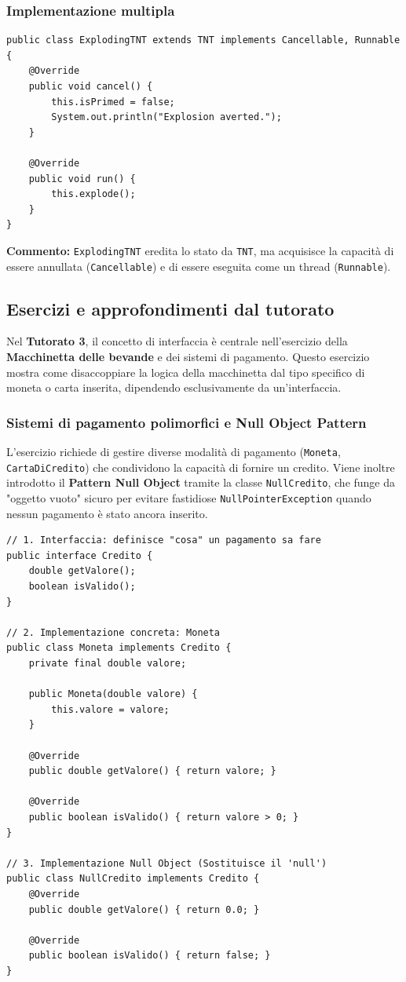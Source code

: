 \documentclass[12pt, a4paper]{article}
\begin{document}
\subsubsection{Implementazione multipla}
\begin{verbatim}
public class ExplodingTNT extends TNT implements Cancellable, Runnable {
    @Override
    public void cancel() {
        this.isPrimed = false;
        System.out.println("Explosion averted.");
    }

    @Override
    public void run() {
        this.explode();
    }
}
\end{verbatim}
\textbf{Commento:} \texttt{ExplodingTNT} eredita lo stato da \texttt{TNT}, ma acquisisce la capacità di essere annullata (\texttt{Cancellable}) e di essere eseguita come un thread (\texttt{Runnable}).

\subsection{Esercizi e approfondimenti dal tutorato}
Nel \textbf{Tutorato 3}, il concetto di interfaccia è centrale nell'esercizio della \textbf{Macchinetta delle bevande} e dei sistemi di pagamento. Questo esercizio mostra come disaccoppiare la logica della macchinetta dal tipo specifico di moneta o carta inserita, dipendendo esclusivamente da un'interfaccia.

\subsubsection{Sistemi di pagamento polimorfici e Null Object Pattern}
L'esercizio richiede di gestire diverse modalità di pagamento (\texttt{Moneta}, \texttt{CartaDiCredito}) che condividono la capacità di fornire un credito. Viene inoltre introdotto il \textbf{Pattern Null Object} tramite la classe \texttt{NullCredito}, che funge da "oggetto vuoto" sicuro per evitare fastidiose \texttt{NullPointerException} quando nessun pagamento è stato ancora inserito.

\newpage

\begin{verbatim}
// 1. Interfaccia: definisce "cosa" un pagamento sa fare
public interface Credito {
    double getValore();
    boolean isValido();
}

// 2. Implementazione concreta: Moneta
public class Moneta implements Credito {
    private final double valore;
    
    public Moneta(double valore) { 
        this.valore = valore; 
    }
    
    @Override
    public double getValore() { return valore; }
    
    @Override
    public boolean isValido() { return valore > 0; }
}

// 3. Implementazione Null Object (Sostituisce il 'null')
public class NullCredito implements Credito {
    @Override
    public double getValore() { return 0.0; }
    
    @Override
    public boolean isValido() { return false; }
}
\end{verbatim}
\end{document}

